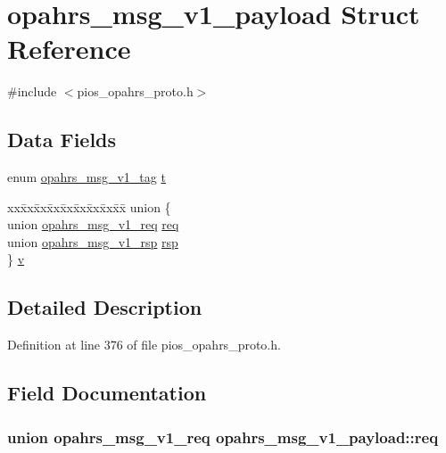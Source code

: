 \hypertarget{structopahrs__msg__v1__payload}{\section{opahrs\-\_\-msg\-\_\-v1\-\_\-payload Struct Reference}
\label{structopahrs__msg__v1__payload}
}


{\ttfamily \#include $<$pios\-\_\-opahrs\-\_\-proto.\-h$>$}

\subsection*{Data Fields}
\begin{DoxyCompactItemize}
\item 
enum \hyperlink{group___p_i_o_s___o_p_a_h_r_s_ga83fcba837e9aa83c34680ef159f5dec7}{opahrs\-\_\-msg\-\_\-v1\-\_\-tag} \hyperlink{structopahrs__msg__v1__payload_a4d8c4463488f7e9ea04e84e7de200425}{t}
\item 
\begin{tabbing}
xx\=xx\=xx\=xx\=xx\=xx\=xx\=xx\=xx\=\kill
union \{\\
\>union \hyperlink{unionopahrs__msg__v1__req}{opahrs\_msg\_v1\_req} \hyperlink{structopahrs__msg__v1__payload_a1fa878de3362ed6d2dfe0d96b9ff1b2e}{req}\\
\>union \hyperlink{unionopahrs__msg__v1__rsp}{opahrs\_msg\_v1\_rsp} \hyperlink{structopahrs__msg__v1__payload_a360508e3914da1cf37129111839d9bb9}{rsp}\\
\} \hyperlink{structopahrs__msg__v1__payload_ab956f79a373f50fc6d8aaa893a9b4680}{v}\\

\end{tabbing}\end{DoxyCompactItemize}


\subsection{Detailed Description}


Definition at line 376 of file pios\-\_\-opahrs\-\_\-proto.\-h.



\subsection{Field Documentation}
\hypertarget{structopahrs__msg__v1__payload_a1fa878de3362ed6d2dfe0d96b9ff1b2e}{
\subsubsection[{req}]{\setlength{\rightskip}{0pt plus 5cm}union {\bf opahrs\-\_\-msg\-\_\-v1\-\_\-req} opahrs\-\_\-msg\-\_\-v1\-\_\-payload\-::req}}\label{structopahrs__msg__v1__payload_a1fa878de3362ed6d2dfe0d96b9ff1b2e}


